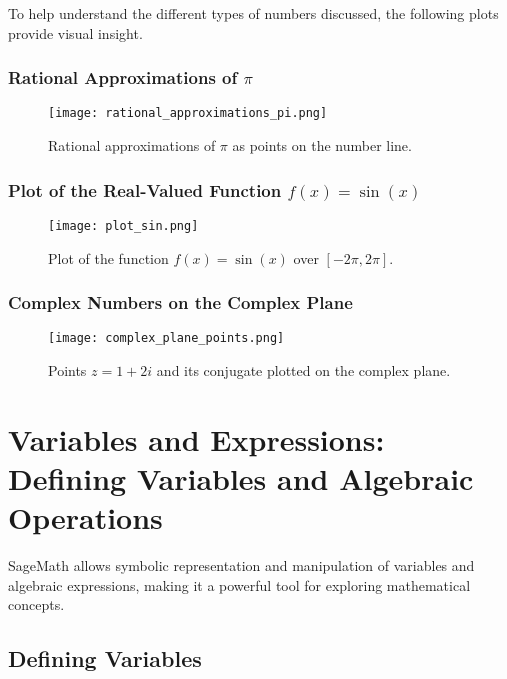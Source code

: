 \documentclass[12pt]{book}
\begin{document}
To help understand the different types of numbers discussed, the following plots provide visual insight.

\subsection{Rational Approximations of \(\pi\)}

\begin{figure}[h]
  \centering
  \texttt{[image: rational\_approximations\_pi.png]}
  \caption{Rational approximations of \(\pi\) as points on the number line.}
  \label{fig:rationals_pi}
\end{figure}

\subsection{Plot of the Real-Valued Function \(f(x) = \sin(x)\)}

\begin{figure}[h]
  \centering
  \texttt{[image: plot\_sin.png]}
  \caption{Plot of the function \(f(x) = \sin(x)\) over \([-2\pi, 2\pi]\).}
  \label{fig:plot_sin}
\end{figure}

\subsection{Complex Numbers on the Complex Plane}

\begin{figure}[h]
  \centering
  \texttt{[image: complex\_plane\_points.png]}
  \caption{Points \(z = 1 + 2i\) and its conjugate plotted on the complex plane.}
  \label{fig:complex_plane_points.png}
\end{figure}

\chapter{Variables and Expressions: Defining Variables and Algebraic Operations}

SageMath allows symbolic representation and manipulation of variables and algebraic expressions, making it a powerful tool for exploring mathematical concepts.

\section{Defining Variables}
\end{document}
